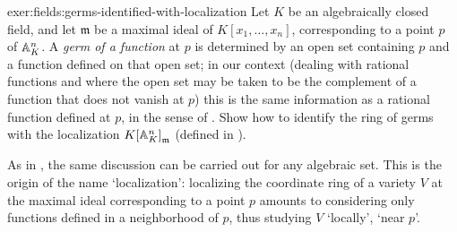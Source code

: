 \begin{exer}{}{exer:fields:germs-identified-with-localization}
  Let $K$ be an algebraically closed field, and let $\mathfrak{m}$ be
  a maximal ideal of $K[x_1, \dots, x_n]$, corresponding to a point
  $p$ of $\mathbb{A}^n_K$. A \emph{germ of a function} at $p$ is determined by
  an open set containing $p$ and a function defined on that open set;
  in our context (dealing with rational functions and where the open
  set may be taken to be the complement of a function that does not
  vanish at $p$) this is the same information as a rational function
  defined at $p$, in the sense of
  . Show
  how to identify the ring of germs with the localization
  $K{[\mathbb{A}^n_K]}_{\mathfrak{m}}$ (defined in
  ).

  As in ,
  the same discussion can be carried out for any algebraic set. This
  is the origin of the name `localization': localizing the coordinate
  ring of a variety $V$ at the maximal ideal corresponding to a point
  $p$ amounts to considering only functions defined in a neighborhood
  of $p$, thus studying $V$ `locally', `near $p$'.
\end{exer}
